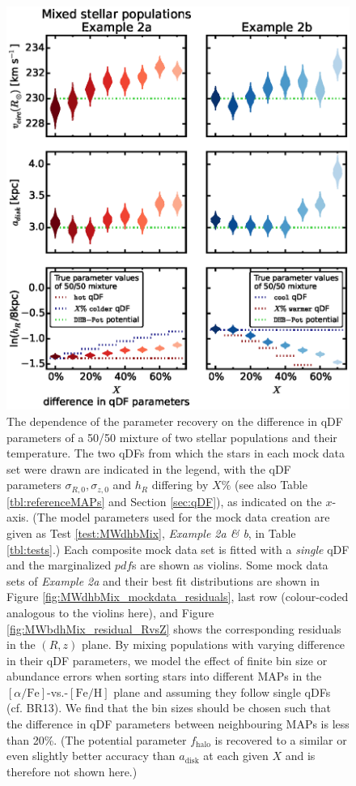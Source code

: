 \documentclass[iop,revtex4,numberedappendix,appendixfloats]{emulateapj}
\newcommand{\pdf}{\ensuremath{pdf}}
\newcommand{\MAPs}{MAPs}
\begin{document}
\begin{figure}[!htbp]
\centering
\includegraphics[scale=0.55]{MWbdhMixDiff_violins.eps}
\caption{The dependence of the parameter recovery on the difference in qDF parameters of a 50/50 mixture of two stellar populations and their temperature. The two qDFs from which the stars in each mock data set were drawn are indicated in the legend, with the qDF parameters $\sigma_{R,0}, \sigma_{z,0}$ and $h_R$ differing by $X\%$ (see also Table \ref{tbl:referenceMAPs} and Section \ref{sec:qDF}), as indicated on the $x$-axis. (The model parameters used for the mock data creation are given as Test \ref{test:MWdhbMix}, \emph{Example 2a \& b}, in Table \ref{tbl:tests}.) Each composite mock data set is fitted with a \emph{single} qDF and the marginalized \pdf{}s are shown as violins. Some mock data sets of \emph{Example 2a} and their best fit distributions are shown in Figure \ref{fig:MWdhbMix_mockdata_residuals}, last row (colour-coded analogous to the violins here), and Figure \ref{fig:MWbdhMix_residual_RvsZ} shows the corresponding residuals in the $(R,z)$ plane. By mixing populations with varying difference in their qDF parameters, we model the effect of finite bin size or abundance errors when sorting stars into different \MAPs{} in the $[\alpha/\mathrm{Fe}]$-vs.-$[\mathrm{Fe}/\mathrm{H}]$ plane and assuming they follow single qDFs (cf. BR13). We find that the bin sizes should be chosen such that the difference in qDF parameters between neighbouring \MAPs{} is less than 20\%. (The potential parameter $f_\text{halo}$ is recovered to a similar or even slightly better accuracy than $a_\text{disk}$ at each given $X$ and is therefore not shown here.)} 
\label{fig:MWdhbMixDiff}
\end{figure}
\end{document}
